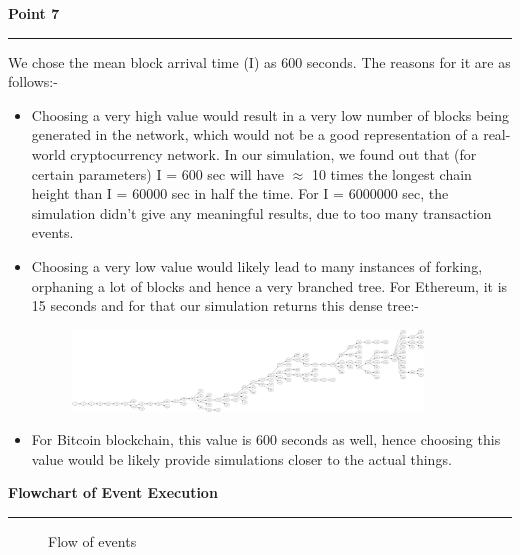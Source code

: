 \documentclass[a4paper,12pt]{article}
\newenvironment{solution}[2][]{%
\begin{mdframed}[linecolor=blue!70!black, linewidth=2pt, roundcorner=10pt, backgroundcolor=yellow!10!white, skipabove=12pt, skipbelow=12pt]%
	\textbf{\large #2}
	\par\noindent\rule{\textwidth}{0.4pt}
}{
\end{mdframed}
}
\begin{document}
\begin{solution}{Point 7}
	We chose the mean block arrival time (I) as 600 seconds. The reasons for it are as follows:-
	\begin{itemize}
		\item Choosing a very high value would result in a very low number of blocks being generated in the network, which would not be a good representation of a real-world cryptocurrency network. In our simulation, we found out that (for certain parameters) I = 600 sec will have $\approx$ 10 times the longest chain height than I = 60000 sec in half the time. For I = 6000000 sec, the simulation didn't give any meaningful results, due to too many transaction events.
		\item Choosing a very low value would likely lead to many instances of forking, orphaning a lot of blocks and hence a very branched tree. For Ethereum, it is 15 seconds and for that our simulation returns this dense tree:-
		\begin{figure}[H]
			\centering
			\includegraphics[width=0.88\textwidth]{ethereum-case.png}
		\end{figure}
		\item For Bitcoin blockchain, this value is 600 seconds as well, hence choosing this value would be likely provide simulations closer to the actual things.
	\end{itemize}
\end{solution}

\begin{solution}{Flowchart of Event Execution}
	\begin{figure}[H]
		\centering
		\caption{Flow of events}
	\end{figure}
\end{solution}
\end{document}
